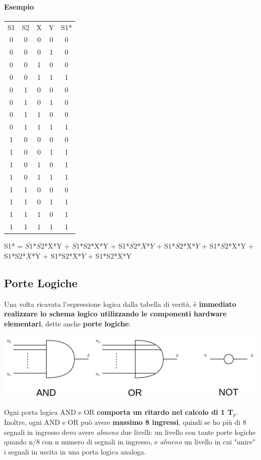 \documentclass[10pt]{report}
\begin{document}
\paragraph{Esempio}
\begin{center}
\begin{tabular}{cccc|c}
S1 & S2 & X & Y & S1* \\
0 & 0 & 0 & 0 & 0\\
0 & 0 & 0 & 1 & 0\\
0 & 0 & 1 & 0 & 0\\
0 & 0 & 1 & 1 & 1\\
0 & 1 & 0 & 0 & 0\\
0 & 1 & 0 & 1 & 0\\
0 & 1 & 1 & 0 & 0\\
0 & 1 & 1 & 1 & 1\\
1 & 0 & 0 & 0 & 0\\
1 & 0 & 0 & 1 & 1\\
1 & 0 & 1 & 0 & 1\\
1 & 0 & 1 & 1 & 1\\
1 & 1 & 0 & 0 & 0\\
1 & 1 & 0 & 1 & 1\\
1 & 1 & 1 & 0 & 1\\
1 & 1 & 1 & 1 & 1\\
\end{tabular}
\end{center}
S1* = $\overline{S1}$*$\overline{S2}$*X*Y + $\overline{S1}$*S2*X*Y + S1*$\overline{S2}$*$\overline{X}$*$\overline{Y}$ + S1*$\overline{S2}$*X*$\overline{Y}$ + S1*$\overline{S2}$*X*Y + S1*S2*$\overline{X}$*Y + S1*S2*X*$\overline{Y}$ + S1*S2*X*Y
\pagebreak
\subsection{Porte Logiche}
Una volta ricavata l'espressione logica dalla tabella di verità, è \textbf{immediato realizzare lo schema logico utilizzando le componenti hardware elementari}, dette anche \textbf{porte logiche}:
\begin{center}
\includegraphics[scale=0.9]{portelogiche.png}
\end{center}
Ogni porta logica AND e OR \textbf{comporta un ritardo nel calcolo di 1 T$_p$}. Inoltre, ogni AND e OR può avere \textbf{massimo 8 ingressi}, quindi se ho più di 8 segnali in ingresso devo avere \textit{almeno} due livelli: un livello con tante porte logiche quando n/8 con n numero di segnali in ingresso, e \textit{almeno} un livello in cui "unire" i segnali in uscita in una porta logica analoga.
\end{document}
